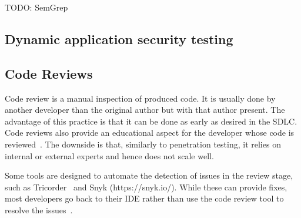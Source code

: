 TODO: SemGrep


\subsection{Dynamic application security testing}

\subsection{Code Reviews}
Code review is a manual inspection of produced code. It is usually done by another developer than the original author but with that author present. 
The advantage of this practice is that it can be done as early as desired in the SDLC. Code reviews also provide an educational aspect for the developer whose code is reviewed~\cite{futcher2008guidelines}.
The downside is that, similarly to penetration testing, it relies on internal or external experts and hence does not scale well. %

Some tools are designed to automate the detection of issues in the review stage, such as Tricorder~\cite{sadowski2015tricorder} and Snyk (https://snyk.io/). While these can provide fixes, most developers go back to their IDE rather than use the code review tool to resolve the issues~\cite{sadowski2015tricorder}.